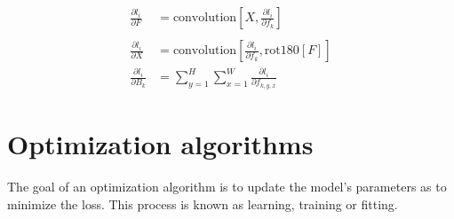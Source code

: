 \documentclass{article}
\begin{document}
\begin{align*}
\frac{\partial l_i}{\partial F} &= \text{convolution}\left[X, \frac{\partial l_i}{\partial f_k}\right] \tag{1} \\\\
\frac{\partial l_i}{\partial X} &= \text{convolution}\left[\frac{\partial l_i}{\partial f_k}, \text{rot180}[F]\right] \tag{2}\\
\frac{\partial l_i}{\partial B_k} &= \sum_{y=1}^{H} \sum_{x=1}^{W} \frac{\partial l_i}{\partial f_{k,y,x}} \tag{3}
\end{align*}

\section{Optimization algorithms}
The goal of an optimization algorithm is to update the model's parameters as to minimize the loss. This process is known as learning, training or fitting.
\end{document}
